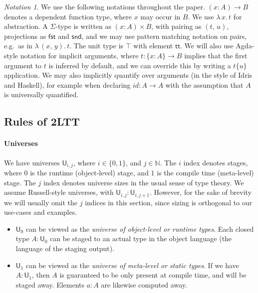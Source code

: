 \documentclass[acmsmall]{acmart}
\newcommand{\mit}[1]{\mathit{#1}}
\newcommand{\msf}[1]{\mathsf{#1}}
\newcommand{\mbb}[1]{\mathbb{#1}}
\renewcommand{\U}{\msf{U}}
\renewcommand{\tt}{\msf{tt}}
\newcommand{\fst}{\msf{fst}}
\newcommand{\snd}{\msf{snd}}
\theoremstyle{remark}
\newtheorem{notation}{Notation}
\begin{document}
\begin{notation}
We use the following notations throughout the paper. $(x : A) \to B$ denotes a
dependent function type, where $x$ may occur in $B$. We use $\lambda\,x.\,t$ for
abstraction. A $\Sigma$-type is written as $(x : A) \times B$, with pairing as
$(t,\,u)$, projections as $\fst$ and $\snd$, and we may use pattern matching
notation on pairs, e.g.\ as in $\lambda\,(x,\,y).\,t$. The unit type is $\top$
with element $\tt$. We will also use Agda-style notation for implicit arguments,
where $t : \{x : A\} \to B$ implies that the first argument to $t$ is inferred
by default, and we can override this by writing a $t \{u\}$ application. We may
also implicitly quantify over arguments (in the style of Idris and Haskell), for
example when declaring $\mit{id} : A \to A$ with the assumption that $A$ is
universally quantified.
\end{notation}

\subsection{Rules of 2LTT}

\paragraph{Universes}
We have universes $\U_{i,j}$, where $i \in \{0,1\}$, and $j \in \mbb{N}$.  The
$i$ index denotes stages, where $0$ is the runtime (object-level) stage, and $1$
is the compile time (meta-level) stage. The $j$ index denotes universe sizes in
the usual sense of type theory. We assume Russell-style universes, with
$\U_{i,j} : \U_{i, j+1}$. However, for the sake of brevity we will usually omit
the $j$ indices in this section, since sizing is orthogonal to our use-cases and
examples.
\begin{itemize}
\item $\U_0$ can be viewed as the \emph{universe of object-level or runtime types}.
    Each closed type $A : \U_0$ can be staged to an actual type in the object language
    (the language of the staging output).
  \item $\U_1$ can be viewed as the \emph{universe of meta-level or static types}. If we
    have $A : \U_1$, then $A$ is guaranteed to be only present at compile time,
    and will be staged away. Elements $a : A$ are likewise computed away.
\end{itemize}
\end{document}
